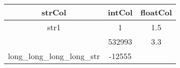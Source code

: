 \begin{tabular}{|c|c|c|}
	\hline
	strCol & intCol & floatCol \\
	\hline
	str1 & 1 & 1.5 \\
	\hline
	 & 532993 & 3.3 \\
	\hline
	long\_long\_long\_long\_str & -12555 &  \\
	\hline
\end{tabular}